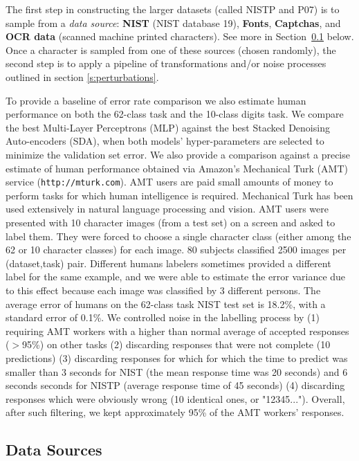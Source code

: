 \documentclass{article} %
\begin{document}
The first step in constructing the larger datasets (called NISTP and P07) is to sample from
a {\em data source}: {\bf NIST} (NIST database 19), {\bf Fonts}, {\bf Captchas},
and {\bf OCR data} (scanned machine printed characters). See more in 
Section~\ref{sec:sources} below. Once a character
is sampled from one of these sources (chosen randomly), the second step is to
apply a pipeline of transformations and/or noise processes outlined in section \ref{s:perturbations}.

To provide a baseline of error rate comparison we also estimate human performance
on both the 62-class task and the 10-class digits task.
We compare the best Multi-Layer Perceptrons (MLP) against
the best Stacked Denoising Auto-encoders (SDA), when
both models' hyper-parameters are selected to minimize the validation set error.
We also provide a comparison against a precise estimate
of human performance obtained via Amazon's Mechanical Turk (AMT)
service ({\tt http://mturk.com}). 
AMT users are paid small amounts
of money to perform tasks for which human intelligence is required.
Mechanical Turk has been used extensively in natural language processing and vision.
AMT users were presented
with 10 character images (from a test set) on a screen
and asked to label them.
They were forced to choose a single character class (either among the
62 or 10 character classes) for each image.
80 subjects classified 2500 images per (dataset,task) pair.
Different humans labelers sometimes provided a different label for the same
example, and we were able to estimate the error variance due to this effect
because each image was classified by 3 different persons. 
The average error of humans on the 62-class task NIST test set
is 18.2\%, with a standard error of 0.1\%.
We controlled noise in the labelling process by (1)
requiring AMT workers with a higher than normal average of accepted
responses ($>$95\%) on other tasks (2) discarding responses that were not
complete (10 predictions) (3) discarding responses for which for which the
time to predict was smaller than 3 seconds for NIST (the mean response time
was 20 seconds) and 6 seconds seconds for NISTP (average response time of
45 seconds) (4) discarding responses which were obviously wrong (10
identical ones, or "12345..."). Overall, after such filtering, we kept
approximately 95\% of the AMT workers' responses.

\subsection{Data Sources}
\label{sec:sources}
\end{document}

